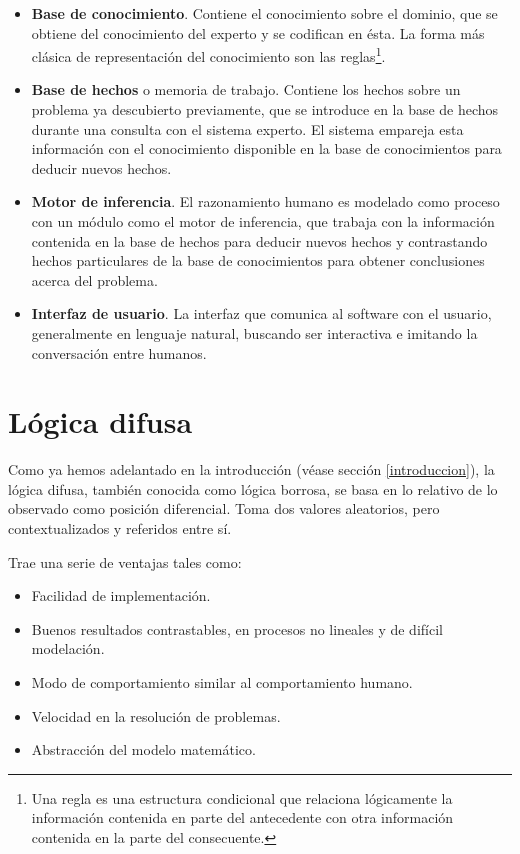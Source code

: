 \documentclass[a4paper, 11pt, titlepage]{article}
\begin{document}
        \begin{itemize}
            \item \textbf{Base de conocimiento}. Contiene el conocimiento sobre el 
            dominio, que se obtiene del conocimiento del experto y se codifican en ésta.
            La forma más clásica de representación del conocimiento son las reglas\footnote{
                Una regla es una estructura condicional que relaciona lógicamente la 
                información contenida en parte del antecedente con otra información 
                contenida en la parte del consecuente.
            }.
            \item \textbf{Base de hechos} o memoria de trabajo. Contiene los hechos sobre 
            un problema ya descubierto previamente, que se introduce en la base de hechos 
            durante una consulta con el sistema experto. El sistema empareja esta información  
            con el conocimiento disponible en la base de conocimientos para deducir nuevos 
            hechos.
            \item \textbf{Motor de inferencia}. El razonamiento humano es modelado como proceso 
            con un módulo como el motor de inferencia, que trabaja con la información contenida 
            en la base de hechos para deducir nuevos hechos y contrastando hechos particulares 
            de la base de conocimientos para obtener conclusiones acerca del problema.
            \item \textbf{Interfaz de usuario}. La interfaz que comunica al software con el usuario, 
            generalmente en lenguaje natural, buscando ser interactiva e imitando la conversación
            entre humanos.
        \end{itemize}
        
\section{Lógica difusa}

    Como ya hemos adelantado en la introducción (véase sección \ref{introduccion}), la lógica difusa, 
    también conocida como lógica borrosa, se basa en lo relativo de lo observado como posición 
    diferencial. Toma dos valores aleatorios, pero contextualizados y referidos entre sí.

    Trae una serie de ventajas tales como:

    \begin{itemize}
        \item Facilidad de implementación.
        \item Buenos resultados contrastables, en procesos no lineales y de difícil modelación.
        \item Modo de comportamiento similar al comportamiento humano.
        \item Velocidad en la resolución de problemas.
        \item Abstracción del modelo matemático.
    \end{itemize}
\end{document}
